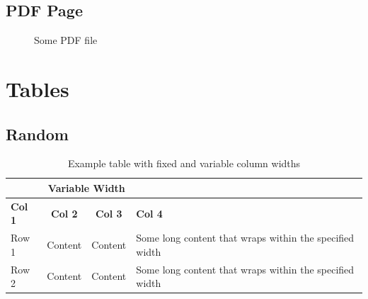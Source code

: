 \documentclass{scrartcl}
\begin{document}
    \newpage
  \subsection{PDF Page}
    \begin{figure}[ht]
      
      \caption{Some PDF file}
      \label{fig:Tangrami}
    \end{figure}
    \FloatBarrier
    \noindent
    \newpage

\section{Tables}
  \subsection{Random}
    \noindent
    \FloatBarrier
    \begin{table}[htbp]
      \centering
      \caption{Example table with fixed and variable column widths}
      \begin{tabular}{|>{\centering\arraybackslash}p{2cm}|c|c|p{3cm}|}
        \hline
        \multicolumn{2}{|c|}{\textbf{Fixed Width}} & \multicolumn{2}{c|}{\textbf{Variable Width}}                                                                            \\
        \hline
        \textbf{Col 1}                             & \textbf{Col 2}                               & \textbf{Col 3} & \textbf{Col 4}                                          \\
        \hline
        Row 1                                      & Content                                      & Content        & Some long content that wraps within the specified width \\
        \hline
        Row 2                                      & Content                                      & Content        & Some long content that wraps within the specified width \\
        \hline
      \end{tabular}
      \label{tab:example}
    \end{table}
    \FloatBarrier
\end{document}
